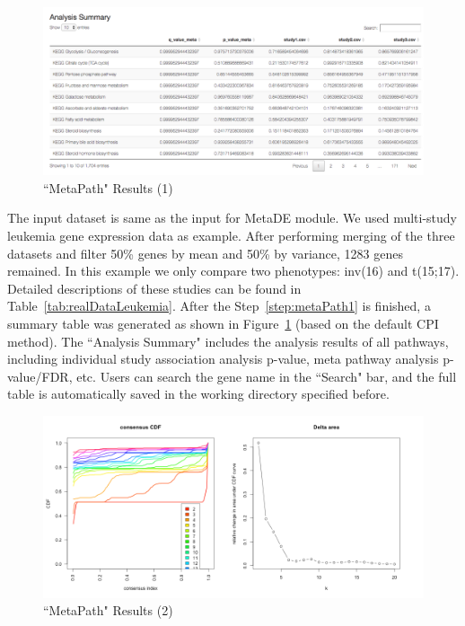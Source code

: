 \begin{figure}[H]
\begin{center}
\includegraphics[scale=0.4]{./figure/metaPath/metaPathresult1.png}
\caption{``MetaPath" Results (1)}
\label{fig:MetaPathresult1}
\end{center}
\end{figure}

The input dataset is same as the input for MetaDE module.
We used multi-study leukemia gene expression data as example.
After performing merging of the three datasets and filter 50\% genes by mean and 50\% by variance, 1283 genes remained.
In this example we only compare two phenotypes: inv(16) and t(15;17).
Detailed descriptions of these studies can be found in Table~\ref{tab:realDataLeukemia}. 
After the Step~\ref{step:metaPath1} is finished, a summary table was generated as shown in Figure~\ref{fig:MetaPathresult1} (based on the default CPI method). The ``Analysis Summary" includes the analysis results of all pathways, including individual study association analysis p-value, meta pathway analysis p-value/FDR, etc. Users can search the gene name in the ``Search" bar, and the full table is automatically saved in the working directory specified before.  

\begin{figure}[H]
\begin{center}
\includegraphics[scale=0.5]{./figure/metaPath/metaPathresult2.png}
\caption{``MetaPath" Results (2)}
\label{fig:MetaPathresult2}
\end{center}
\end{figure}

